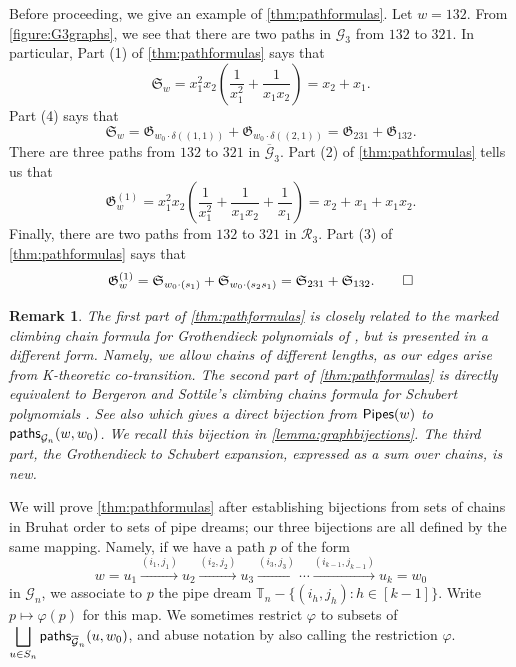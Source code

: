 \documentclass[12 pt]{amsart}
\newcommand{\paths}{{\sf paths}}
\newtheorem{remark}[Theorem]{Remark}
\numberwithin{equation}{section}
\theoremstyle{remark}
\newenvironment{example}
{\pushQED{\qed}\renewcommand{\qedsymbol}{$\diamondsuit$}\examplex}
{\popQED\endexamplex}
\newcommand{\pipes}{{\sf Pipes}}
\newcommand{\demprod}{\delta}
\begin{document}
	Before proceeding, we give an example of \cref{thm:pathformulas}.
	\begin{example}
		Let $w=132$. From \cref{figure:G3graphs}, we see that there are two paths in $\mathcal G_3$ from $132$ to $321$. In particular, Part (1) of \cref{thm:pathformulas} says that
		\[\mathfrak S_w=x_1^2x_2(\frac{1}{x_1^2}+\frac{1}{x_1x_2})=x_2+x_1.\]
		Part (4) says that
		\[\mathfrak S_w=\mathfrak G_{w_0\cdot \demprod((1,1))}+\mathfrak G_{w_0\cdot \demprod((2,1))}=\mathfrak G_{231}+\mathfrak G_{132}.\]
		There are three paths from $132$ to $321$ in $\overline{\mathcal G}_3$. 
		Part (2) of \cref{thm:pathformulas} tells us that
		\[\mathfrak G_{w}^{(1)}=x_1^2x_2(\frac{1}{x_1^2}+\frac{1}{x_1x_2}+\frac{1}{x_1})=x_2+x_1+x_1x_2.\]
		Finally, there are two paths from $132$ to $321$ in $\mathcal R_3$. Part (3) of \cref{thm:pathformulas} says that
		\[\mathfrak G_{w}^{(1)}=\mathfrak S_{w_0\cdot(s_1)}+\mathfrak S_{w_0\cdot (s_2s_1)}=\mathfrak S_{231}+\mathfrak S_{132}. \qedhere\]
	\end{example}
		
		\begin{remark}
			The first part of \cref{thm:pathformulas} is closely related to the marked climbing chain formula for Grothendieck polynomials of \cite{Lenart.Robinson.Sottile}, but is presented in a different form. Namely, we allow chains of different lengths, as our edges arise from K-theoretic co-transition.
			The second part of \cref{thm:pathformulas} is directly equivalent to Bergeron and Sottile's climbing chains formula for Schubert polynomials \cite{Bergeron.Sottile}. 
			See also \cite{Lenart.Sottile} which gives a direct bijection from $\pipes(w)$ to $\paths_{\mathcal{G}_n}(w,w_0)$. 
			We recall this bijection in \cref{lemma:graphbijections}. 
			The third part, the Grothendieck to Schubert expansion, expressed as a sum over chains, is new. 
		\end{remark}
		
		We will prove \cref{thm:pathformulas} after establishing bijections from sets of chains in Bruhat order to sets of pipe dreams; our three bijections are all defined by the same mapping. Namely, if we have a path $p$ of the form
		\[w=u_1\xrightarrow{(i_1,j_1)}u_2 \xrightarrow{(i_2,j_2)} u_3\xrightarrow{(i_3,j_3)} \cdots \xrightarrow{(i_{k-1},j_{k-1})} u_k = w_0\] in $\mathcal{G}_n$, we associate to $p$ the pipe dream $\mathbb{T}_n-\{(i_h,j_h):h \in [k-1]\}$. 
		Write $p \mapsto \varphi(p)$ for this map. We sometimes restrict $\varphi$ to subsets of $\displaystyle \bigsqcup_{u\in S_n} \paths_{\overline{\mathcal{G}}_n}(u,w_0)$, and abuse notation by also calling the restriction $\varphi$.
		
\end{document}
